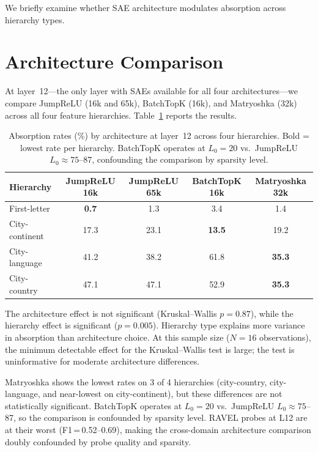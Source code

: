 \documentclass{article}
\begin{document}
We briefly examine whether SAE architecture modulates absorption across hierarchy types.

\section{Architecture Comparison}
\label{sec:architecture}

At layer~12---the only layer with SAEs available for all four architectures---we compare JumpReLU (16k and 65k), BatchTopK (16k), and Matryoshka (32k) across all four feature hierarchies. Table~\ref{tab:architecture} reports the results.

\begin{table}[t]
\caption{Absorption rates (\%) by architecture at layer~12 across four hierarchies. Bold = lowest rate per hierarchy. BatchTopK operates at $L_0 = 20$ vs.\ JumpReLU $L_0 \approx 75$--87, confounding the comparison by sparsity level.}
\label{tab:architecture}
\centering
\small
\begin{tabular}{@{}lcccc@{}}
\toprule
Hierarchy & JumpReLU 16k & JumpReLU 65k & BatchTopK 16k & Matryoshka 32k \\
\midrule
First-letter    & \textbf{0.7} & 1.3  & 3.4  & 1.4  \\
City-continent  & 17.3 & 23.1 & \textbf{13.5} & 19.2 \\
City-language   & 41.2 & 38.2 & 61.8 & \textbf{35.3} \\
City-country    & 47.1 & 47.1 & 52.9 & \textbf{35.3} \\
\bottomrule
\end{tabular}
\end{table}

The architecture effect is not significant (Kruskal--Wallis $p = 0.87$), while the hierarchy effect is significant ($p = 0.005$). Hierarchy type explains more variance in absorption than architecture choice. At this sample size ($N = 16$ observations), the minimum detectable effect for the Kruskal--Wallis test is large; the test is uninformative for moderate architecture differences.

Matryoshka shows the lowest rates on 3 of 4 hierarchies (city-country, city-language, and near-lowest on city-continent), but these differences are not statistically significant. BatchTopK operates at $L_0 = 20$ vs.\ JumpReLU $L_0 \approx 75$--87, so the comparison is confounded by sparsity level. RAVEL probes at L12 are at their worst (F1\,=\,0.52--0.69), making the cross-domain architecture comparison doubly confounded by probe quality and sparsity.
\end{document}
